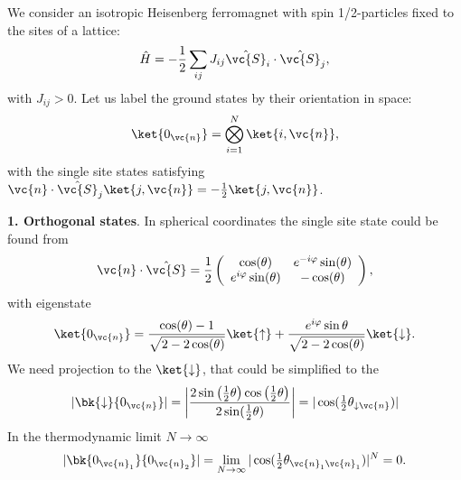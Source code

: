 We consider an isotropic Heisenberg ferromagnet with spin 1/2-particles fixed to the sites of a lattice:
\begin{equation*}
	\hat{H} = - \frac{1}{2} \sum_{ij} J_{ij} \hat{\vc{S}}_i \cdot \hat{\vc{S}}_j,
\end{equation*}
with $J_{ij} > 0$. Let us label the ground states by their orientation in space:
\begin{equation*}
	\ket{0_{\vc{n}}} = \bigotimes_{i=1}^N \ket{i, \vc{n}},
\end{equation*}
with the single site states satisfying $\vc{n} \cdot \hat{\vc{S}}_j \ket{j, \vc{n}} = - \frac{1}{2} \ket{j, \vc{n}}$.

\textbf{1. Orthogonal states}. In spherical coordinates the single site state could be found from
\begin{equation*}
	\vc{n} \cdot \hat{\vc{S}} = \frac{1}{2} \left(
	\begin{array}{cc}
	 \cos (\theta ) & e^{-i \varphi } \sin (\theta ) \\
	 e^{i \varphi } \sin (\theta ) & -\cos (\theta ) \\
	\end{array}
	\right),
\end{equation*}
with eigenstate
\begin{equation*}
	\ket{0_{\vc{n}}} = \frac{\cos(\theta)-1}{\sqrt{2-2 \cos (\theta )}}\ket{\uparrow} + \frac{e^{i \varphi} \sin \theta}{\sqrt{2-2 \cos (\theta )}}\ket{\downarrow}.
\end{equation*}
We need projection to the $\ket{\downarrow}$, that could be simplified to the
\begin{equation*}
	|\bk{\downarrow}{0_{\vc{n}}}| = \bigg|\frac{2 \sin\left(\tfrac{1}{2}\theta\right)\cos\left(\tfrac{1}{2}\theta\right)}{2 \sin(\tfrac{1}{2}\theta)}\bigg| = |\cos(\tfrac{1}{2}\theta_{\downarrow \vc{n}})|
\end{equation*}
In the thermodynamic limit $N \to \infty$ 
\begin{equation*}
	| \bk{0_{ \vc{n}_1}}{0_{ \vc{n}_2}}| = \lim_{N \to \infty} |\cos(\tfrac{1}{2}\theta_{ \vc{n}_1 \vc{n}_1})|^N = 0.
\end{equation*}

